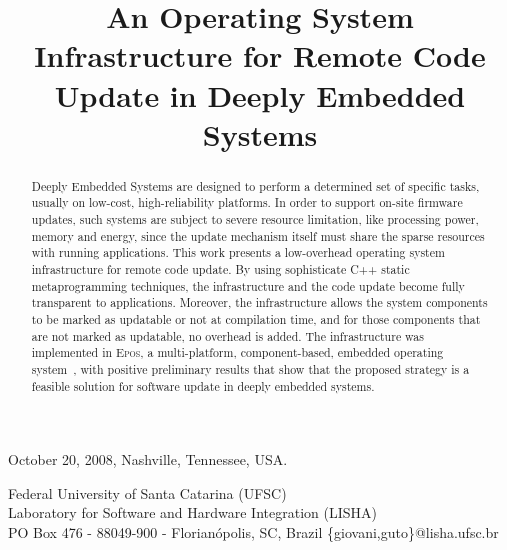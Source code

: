 \documentclass[10pt]{sigplanconf}
\newcommand{\epos}{\textsc{Epos}}
\begin{document}
\authorpermission
{} {October 20, 2008, Nashville, Tennessee, USA.}



\title{An Operating System Infrastructure for Remote Code Update in Deeply Embedded Systems}

           {Federal University of Santa Catarina (UFSC)\\Laboratory for Software and Hardware Integration (LISHA)\\ PO Box 476 - 88049-900 - Florian\'{o}polis, SC, Brazil}
           {\{giovani,guto\}@lisha.ufsc.br}

\maketitle

\begin{abstract}
  Deeply Embedded Systems are designed to perform a determined set of
  specific tasks, usually on low-cost, high-reliability platforms. In
  order to support on-site firmware updates, such systems are subject
  to severe resource limitation, like processing power, memory and
  energy, since the update mechanism itself
  must share the sparse resources with running applications.  This
  work presents a low-overhead operating system infrastructure for
  remote code update. By using sophisticate C++ static metaprogramming techniques,
  the infrastructure and the code update become fully transparent to applications. 
  Moreover, the infrastructure allows the system components to be marked as updatable or not
  at compilation time, and for those components that are not marked as updatable, no
  overhead is added. The infrastructure was
  implemented in \epos{}, a multi-platform, component-based, embedded
  operating system~\cite{Froehlich:2001}, with positive preliminary
  results that show that the proposed strategy is a feasible solution 
  for software update in deeply embedded systems.
\end{abstract}

\end{document}
